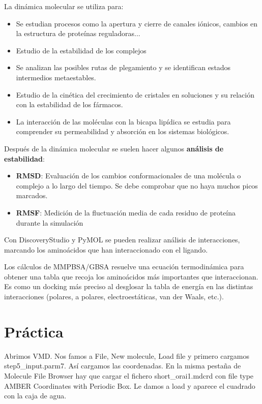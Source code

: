 La dinámica molecular se utiliza para:
\begin{itemize}
\item Se estudian procesos como la apertura y cierre de canales iónicos, cambios en la estructura de proteínas reguladoras...
\item Estudio de la estabilidad de los complejos
\item Se analizan las posibles rutas de plegamiento y se identifican estados intermedios metaestables. 
\item Estudio de la cinética del crecimiento de cristales en soluciones y su relación con la estabilidad de los fármacos.
\item La interacción de las moléculas con la bicapa lipídica se estudia para comprender su permeabilidad y absorción en los sistemas biológicos.
\end{itemize}

Después de la dinámica molecular se suelen hacer algunos \textbf{análisis de estabilidad}:
\begin{itemize}
\item \textbf{RMSD}: Evaluación de los cambios conformacionales de una molécula o complejo a lo largo del tiempo. Se debe comprobar que no haya muchos picos marcados.
\item \textbf{RMSF}: Medición de la fluctuación media de cada residuo de proteína durante la simulación 
\end{itemize}

Con DiscoveryStudio y PyMOL se pueden realizar análisis de interacciones, marcando los aminoácidos que han interaccionado con el ligando.

Los cálculos de MMPBSA/GBSA resuelve una ecuación termodinámica para obtener una tabla que recoja los aminoácidos más importantes que interaccionan. Es como un docking más preciso al desglosar la tabla de energía en las distintas interacciones (polares, a polares, electroestáticas, van der Waals, etc.).

\section{Práctica}
Abrimos VMD. Nos famos a File, New molecule, Load file y primero cargamos step5\_input.parm7. Así cargamos las coordenadas. En la misma pestaña de Molecule File Browser hay que cargar el fichero short\_orai1.mdcrd con file type AMBER Coordinates with Periodic Box. Le damos a load y aparece el cuadrado con la caja de agua. 

